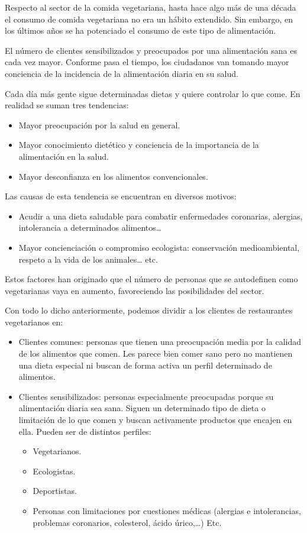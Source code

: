 Respecto al sector de la comida vegetariana, hasta hace algo más de una década el consumo de comida vegetariana no era un hábito extendido. Sin embargo, en los últimos años se ha potenciado el consumo de este tipo de alimentación.

El número de clientes sensibilizados y preocupados por una alimentación sana es cada vez mayor. Conforme pasa el tiempo, los ciudadanos van tomando mayor conciencia de la incidencia de la alimentación diaria en su salud.

Cada día más gente sigue determinadas dietas y quiere controlar lo que come. En realidad se suman tres tendencias:
\begin{itemize}
\item Mayor preocupación por la salud en general. 
\item Mayor conocimiento dietético y conciencia de la importancia de la alimentación en la salud. 
\item Mayor desconfianza en los alimentos convencionales.
\end{itemize}

Las causas de esta tendencia se encuentran en diversos motivos:
\begin{itemize}
\item Acudir a una dieta saludable para combatir enfermedades coronarias, alergias, intolerancia a determinados alimentos… 
\item Mayor concienciación o compromiso ecologista: conservación medioambiental, respeto a la vida de los animales… etc.
\end{itemize}

Estos factores han originado que el número de personas que se autodefinen como vegetarianas vaya en aumento, favoreciendo las posibilidades del sector.

Con todo lo dicho anteriormente, podemos dividir a los clientes de restaurantes vegetarianos en:

\begin{itemize}
\item Clientes comunes: personas que tienen una preocupación media por la calidad de los alimentos que comen. Les parece bien comer sano pero no mantienen una dieta especial ni buscan de forma activa un perfil determinado de alimentos.
\item Clientes sensibilizados: personas especialmente preocupadas porque su alimentación diaria sea sana. Siguen un determinado tipo de dieta o limitación de lo que comen y buscan activamente productos que encajen en ella. Pueden ser de distintos perfiles:
\begin{itemize}
\item Vegetarianos. 
\item Ecologistas. 
\item Deportistas. 
\item Personas con limitaciones por cuestiones médicas (alergias e intolerancias, problemas coronarios, colesterol, ácido úrico,…) Etc.
\end{itemize}
\end{itemize}

